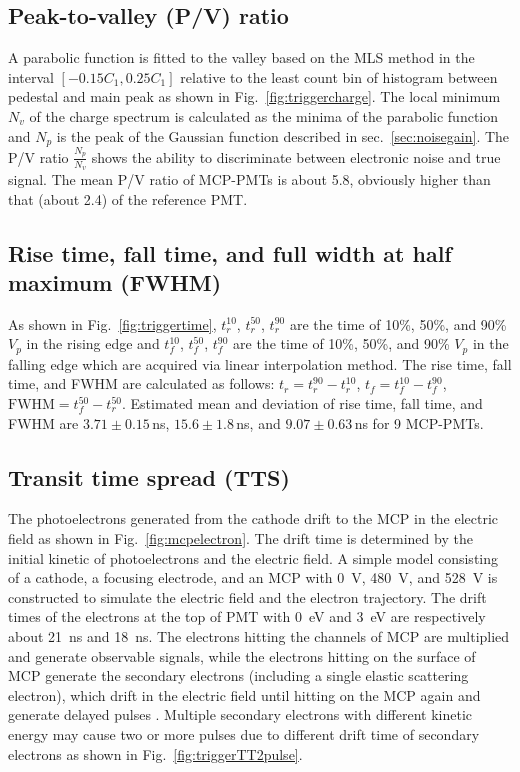 \subsection{Peak-to-valley (P/V) ratio}
A parabolic function is fitted to the valley based on the MLS method in the interval $[-0.15C_1, 0.25C_1]$ relative to the least count bin of histogram between pedestal and main peak as shown in Fig.~\ref{fig:triggercharge}. The local minimum $N_v$ of the charge spectrum is calculated as the minima of the parabolic function and $N_p$ is the peak of the Gaussian function described in sec.~\ref{sec:noisegain}. The P/V ratio $\frac{N_p}{N_v}$ shows the ability to discriminate between electronic noise and true signal. The mean P/V ratio of MCP-PMTs is about 5.8, obviously higher than that (about 2.4) of the reference PMT.

\subsection{Rise time, fall time, and full width at half maximum (FWHM)}
As shown in Fig.~\ref{fig:triggertime}, $t^{10}_r$, $t^{50}_r$, $t^{90}_r$ are the time of 10\%, 50\%, and 90\% $V_p$ in the rising edge and $t^{10}_f$, $t^{50}_f$, $t^{90}_f$ are the time of 10\%, 50\%, and 90\% $V_p$ in the falling edge which are acquired via linear interpolation method. The rise time, fall time, and FWHM are calculated as follows: $t_r = t^{90}_r - t^{10}_r$, $t_f = t^{10}_f - t^{90}_f$, $\mathrm{FWHM} = t^{50}_f - t^{50}_r$. Estimated mean and deviation of rise time, fall time, and FWHM are $3.71\pm0.15$\,ns, $15.6\pm1.8$\,ns, and $9.07\pm0.63$\,ns for 9 MCP-PMTs.

\subsection{Transit time spread (TTS)}
The photoelectrons generated from the cathode drift to the MCP in the electric field as shown in Fig.~\ref{fig:mcpelectron}. The drift time is determined by the initial kinetic of photoelectrons and the electric field. A simple model consisting of a cathode, a focusing electrode, and an MCP with \SI{0}{V}, \SI{480}{V}, and \SI{528}{V} is constructed to simulate the electric field and the electron trajectory. The drift times of the electrons at the top of PMT with \SI{0}{eV} and \SI{3}{eV} are respectively about \SI{21}{ns} and \SI{18}{ns}. The electrons hitting the channels of MCP are multiplied and generate observable signals, while the electrons hitting on the surface of MCP generate the secondary electrons (including a single elastic scattering electron), which drift in the electric field until hitting on the MCP again and generate delayed pulses \cite{KM3NetTesting}. Multiple secondary electrons with different kinetic energy may cause two or more pulses due to different drift time of secondary electrons as shown in Fig.~\ref{fig:triggerTT2pulse}.

